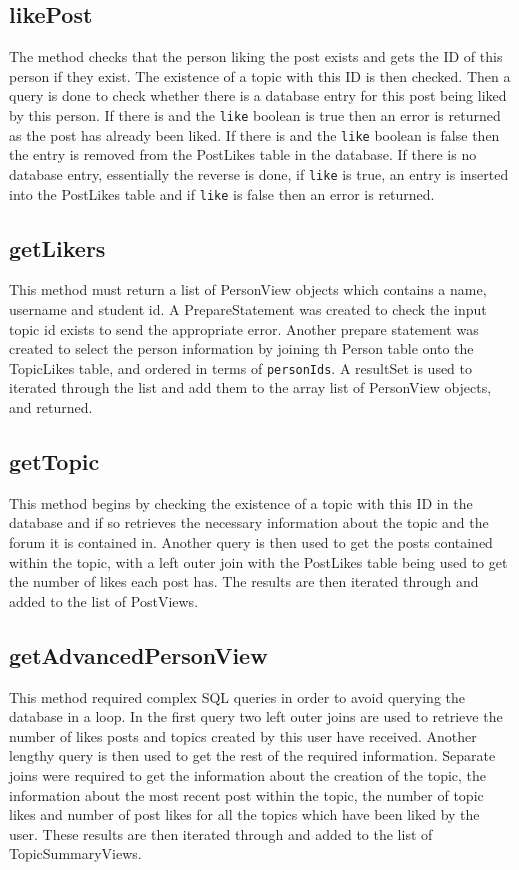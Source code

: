 \documentclass{article}
\begin{document}
\subsection*{likePost}

The method checks that the person liking the post exists and gets the ID of this person if they exist. The existence of a topic with this ID is then checked. Then a query is done to check whether there is a database entry for this post being liked by this person. If there is and the \texttt{like} boolean is true then an error is returned as the post has already been liked. If there is and the \texttt{like} boolean is false then the entry is removed from the PostLikes table in the database. If there is no database entry, essentially the reverse is done, if \texttt{like} is true, an entry is inserted into the PostLikes table and if \texttt{like} is false then an error is returned.

\subsection*{getLikers}

This method must return a list of PersonView objects which contains a name, username and student id. A PrepareStatement was created to check the input topic id exists to send the appropriate error. Another prepare statement was created to select the person information by joining th Person table onto the TopicLikes table, and ordered in terms of \texttt{personIds}. A resultSet is used to iterated through the list and add them to the array list of PersonView objects, and returned.

\subsection*{getTopic}

This method begins by checking the existence of a topic with this ID in the database and if so retrieves the necessary information about the topic and the forum it is contained in. Another query is then used to get the posts contained within the topic, with a left outer join with the PostLikes table being used to get the number of likes each post has. The results are then iterated through and added to the list of PostViews.

\subsection*{getAdvancedPersonView}

This method required complex SQL queries in order to avoid querying the database in a loop. In the first query two left outer joins are used to retrieve the number of likes posts and topics created by this user have received. Another lengthy query is then used to get the rest of the required information. Separate joins were required to get the information about the creation of the topic, the information about the most recent post within the topic, the number of topic likes and number of post likes for all the topics which have been liked by the user. These results are then iterated through and added to the list of TopicSummaryViews.
\end{document}
